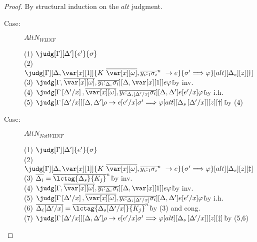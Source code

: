 \LinearSubstitutionAltsLemma

\begin{proof}
By structural induction on the $alt$ judgment.

\begin{description}
\item[Case:] $AltN_{WHNF}$
\begin{tabbing}
    (1) $\judg[\G][\D']{e'}{\s}$\\
    (2) $\judg[\G][\D,\xl]{\konstructor~\to e}{\s' \Longrightarrow \vp}[alt][\D_s][z][\dag]$\\
    (3) $\judg[\G,\ov{\xo},\ov{y_i{:}_{\D_i}\s_i}][\D,\xl]{e}{\vp}$\`by inv.\\
    (4) $\judg[\subst{\G}{\D'}{x},\ov{\xo},\ov{y_i{:}_{\subst{\D_i}{\D'}{x}}\s_i}][\D,\D']{e[e'/x]}{\vp}$\` by i.h.\\
    (5) $\judg[\subst{\G}{\D'}{x}][\D,\D']{\rho \to e[e'/x]}{\s' \Longrightarrow \vp}[alt][\subst{\D_s}{\D'}{x}][z][\dag]$\` by (4)\\
\end{tabbing}

\item[Case:] $AltN_{Not WHNF}$
\begin{tabbing}
    (1) $\judg[\G][\D']{e'}{\s}$\\
    (2) $\judg[\G][\D,\xl]{\konstructor~\to e}{\s' \Longrightarrow \vp}[alt][\D_s][z][\ddag]$\\
    (3) $\ov{\D_i}=\ov{\lctag{\D_s}{K_j}}^n$\`by inv.\\
    (4) $\judg[\G,\ov{\xo},\ov{y_i{:}_{\D_i}\s_i}][\D,\xl]{e}{\vp}$\`by inv.\\
    (5) $\judg[\subst{\G}{\D'}{x},\ov{\xo},\ov{y_i{:}_{\subst{\D_i}{\D'}{x}}\s_i}][\D,\D']{e[e'/x]}{\vp}$\` by i.h.\\
    (6) $\ov{\D_i[\D'/x]}=\ov{\lctag{\D_s[\D'/x]}{K_j}}^n$\`by (3) and cong.\\
    (7) $\judg[\subst{\G}{\D'}{x}][\D,\D']{\rho \to e[e'/x]}{\s' \Longrightarrow \vp}[alt][\subst{\D_s}{\D'}{x}][z][\ddag]$\` by (5,6)\\
\end{tabbing}


\end{description}
\end{proof}
